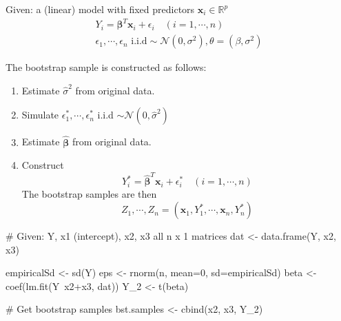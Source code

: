  \begin{theory}
  Given: a (linear) model with fixed predictors $\mathbf{x}_i \in \mathbb{R}^p$
  \begin{gather*}
      Y_i = \boldsymbol{\beta}^T \mathbf{x}_i + \epsilon_i \quad (i = 1, \cdots, n) \\
     \epsilon_1, \cdots, \epsilon_n \text{ i.i.d} \sim \mathcal{N}(0, \sigma^2), \theta = (\beta, \sigma^2)
  \end{gather*}

  The bootstrap sample is constructed as follows:
  \begin{enumerate}
   \item Estimate $\hat{\sigma}^2$ from original data.
   \item Simulate $\epsilon_1^{\ast}, \cdots, \epsilon_n^{\ast}$ i.i.d $\sim \mathcal{N}(0, \hat{\sigma}^2)$
   \item Estimate $\boldsymbol{\hat{\beta}}$ from original data.
   \item Construct
         \begin{equation*}
             Y_i^{\ast} = \boldsymbol{\hat{\beta}}^T \mathbf{x}_i + \epsilon^{\ast}_i \quad (i = 1, \cdots, n)
         \end{equation*}
         The bootstrap samples are then
         \begin{equation*}
          Z_1, \cdots, Z_n = (\mathbf{x}_1, Y_1^{\ast}, \cdots, \mathbf{x}_n, Y_n^{\ast})
         \end{equation*}
  \end{enumerate}
 \end{theory}
 
 \begin{code}
  # Given: Y, x1 (intercept), x2, x3 all n x 1 matrices
  dat <- data.frame(Y, x2, x3)
  
  empiricalSd <- sd(Y)
  eps <- rnorm(n, mean=0, sd=empiricalSd)
  beta <- coef(lm.fit(Y~x2+x3, dat))
  Y_2 <- t(beta) %
  
  # Get bootstrap samples
  bst.samples <- cbind(x2, x3, Y_2)
 \end{code}
